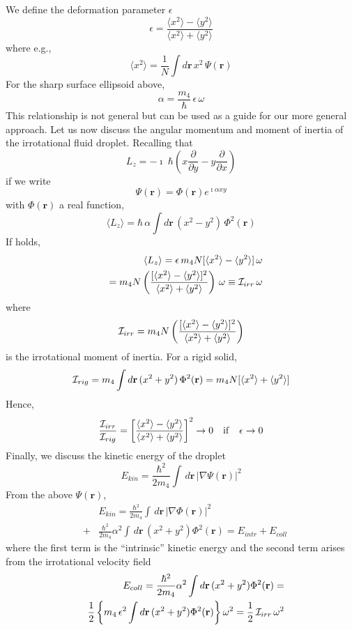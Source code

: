 We define the deformation parameter $\epsilon$
%
$$
\epsilon =\frac{\langle x^2 \rangle - \langle y^2 \rangle}{\langle x^2 \rangle + \langle y^2 \rangle}
$$
%
where e.g., 
$$ \langle x^2 \rangle = \frac{1}{N} \int d\mathbf{r} \,  x^2 \,\Psi(\mathbf{r}) $$
%
For the sharp surface ellipsoid above,
%
\begin{equation}
 \alpha = \frac{m_4}{\hbar} \, \epsilon \, \omega
 \label{eps}
 \end{equation}
%
This relationship is not  general but  can be used as a guide for our more general approach.
Let us  now discuss the angular momentum and moment of inertia of the irrotational fluid droplet. Recalling that
%
$$L_z = - \imath \; \hbar \left( x \frac{\partial}{\partial y} -  y \frac{\partial}{\partial x}\right)$$
%
if we write 
%
$$\Psi(\mathbf{r}) = \Phi(\mathbf{r}) e^{\imath \alpha xy}$$
%
with $\Phi(\mathbf{r})$ a real function,
%
$$\langle L_z \rangle = \hbar\,  \alpha  \int d\mathbf{r} \,  (x^2-y^2)  \,\Phi^2(\mathbf{r})$$
%
If  holds,
%
\begin{eqnarray}
&&\langle L_z \rangle = \epsilon \, m_4 N  [\langle x^2 \rangle - \langle y^2\rangle]\, \omega   
\nonumber
\\ 
&& = m_4  N \left( \frac{[\langle x^2 \rangle - \langle y^2\rangle ]^2}{\langle x^2 \rangle + \langle y^2\rangle} \right)\, \omega  \equiv  {\cal I}_{irr} \, \omega
 \label{irrot}
\end{eqnarray}
%
where 
%
$$ {\cal I}_{irr} = m_4 N \left( \frac{[\langle x^2 \rangle - \langle y^2\rangle ]^2}{\langle x^2 \rangle + \langle y^2\rangle} \right)$$
%
is the irrotational moment of inertia. For a rigid solid,
%
$$  {\cal I}_{rig} =  m_4  \int d\mathbf{r} \,  (x^2+y^2)  \,\Phi^2(\mathbf{r}) = m_4 N [\langle x^2 \rangle + \langle y^2\rangle] $$
%
Hence, 
%
$$ \frac{{\cal I}_{irr}}{{\cal I}_{rig}} = \left[ \frac{\langle x^2 \rangle - \langle y^2\rangle }{\langle x^2 \rangle + \langle y^2\rangle} \right]^2 \rightarrow 0 \quad {\rm if} \quad \epsilon \rightarrow 0$$
%
Finally, we discuss the kinetic energy of the droplet
%
$$ E_{kin} = \frac{\hbar^2}{2 m_4}  \int \, d\mathbf{r} \,|\nabla \Psi(\mathbf{r})|^2$$
%
From the above $\Psi(\mathbf{r})$, 
%
\begin{eqnarray}
&&E_{kin}= \frac{\hbar^2}{2 m_4}  \int \, d\mathbf{r} \,|\nabla \Phi(\mathbf{r})|^2
\nonumber
\\
\nonumber
&+& \frac{\hbar^2}{2 m_4} \alpha^2 \int \, d\mathbf{r} \, (x^2 + y^2) \Phi^2(\mathbf{r})= E_{intr}+E_{coll}
\end{eqnarray}
%
where the first term is the ``intrinsic'' kinetic energy and the second term arises from the irrotational velocity field
%
\begin{eqnarray}
&&E_{coll}= \frac{\hbar^2}{2 m_4} \alpha^2 \int  d\mathbf{r} \, (x^2 + y^2) \Phi^2(\mathbf{r}) =
\nonumber
\\
\nonumber
&& \frac{1}{2} \left\{ m_4\, \epsilon^2 \int d\mathbf{r} \, (x^2 + y^2) \Phi^2(\mathbf{r})\right\} \omega^2= \frac{1}{2}\, {\cal I}_{irr} \,\omega^2
 \end{eqnarray}
% 

